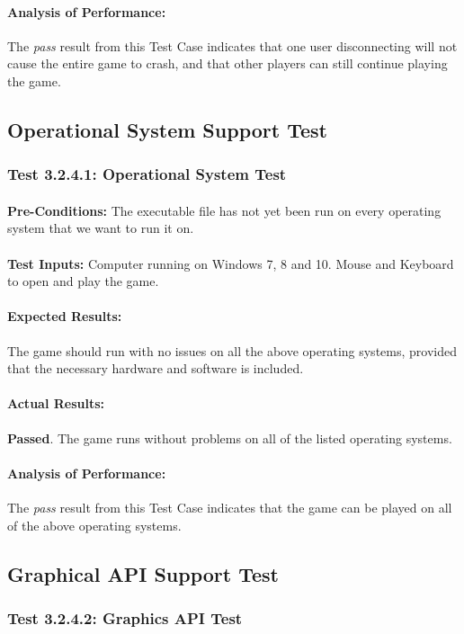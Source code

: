 \documentclass{article}
\begin{document}
    \paragraph{Analysis of Performance:} The \emph{pass} result from this Test Case indicates that one user disconnecting will not cause the entire game to crash, and that other players can still continue playing the game.
\subsection{Operational System Support Test}
\subsubsection{Test 3.2.4.1: Operational System Test }
    \paragraph{}\textbf{Pre-Conditions:} The executable file has not yet been run on every operating system that we want to run it on.
    \paragraph{}\textbf{Test Inputs:} Computer running on Windows 7, 8 and 10. Mouse and Keyboard to open and play the game.
    \paragraph{Expected Results:} The game should run with no issues on all the above operating systems, provided that the necessary hardware and software is included.
    \paragraph{Actual Results:} \textbf{Passed}. The game runs without problems on all of the listed operating systems. 
    \paragraph{Analysis of Performance:} The \emph{pass} result from this Test Case indicates that the game can be played on all of the above operating systems.
\subsection{Graphical API Support Test}
\subsubsection{Test 3.2.4.2: Graphics API Test }
\end{document}
